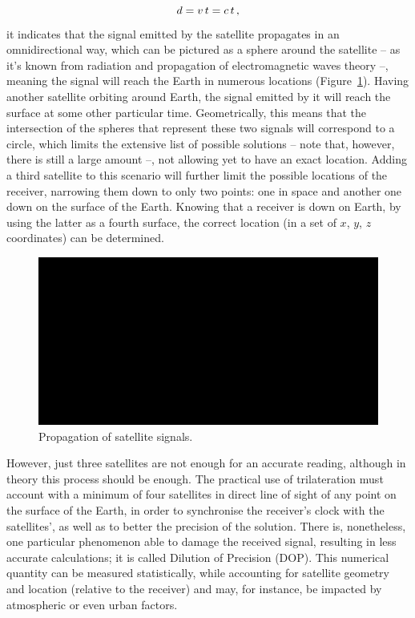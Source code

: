 \begin{equation}
    d = v\,t = c\,t\,,\medskip
\end{equation}
it indicates that the signal emitted by the satellite propagates in an omnidirectional way, which can be pictured as a sphere around the satellite -- as it's known from radiation and propagation of electromagnetic waves theory --, meaning the signal will reach the Earth in numerous locations (Figure~\ref{fig:omnidirectional}).
Having another satellite orbiting around Earth, the signal emitted by it will reach the surface at some other particular time. Geometrically, this means that the intersection of the spheres that represent these two signals will correspond to a circle, which limits the extensive list of possible solutions -- note that, however, there is still a large amount --, not allowing yet to have an exact location. Adding a third satellite to this scenario will further limit the possible locations of the receiver, narrowing them down to only two points: one in space and another one down on the surface of the Earth. Knowing that a receiver is down on Earth, by using the latter as a fourth surface, the correct location (in a set of $x$, $y$, $z$ coordinates) can be determined.
\begin{figure}[ht]
	\centering
	\includegraphics[width=1.0\textwidth]{Chapters/Figures/demo.png}
	\caption{Propagation of satellite signals.}
	\label{fig:omnidirectional}
\end{figure}
However, just three satellites are not enough for an accurate reading, although in theory this process should be enough. The practical use of trilateration must account with a minimum of four satellites in direct line of sight of any point on the surface of the Earth, in order to synchronise the receiver's clock with the satellites', as well as to better the precision of the solution.
There is, nonetheless, one particular phenomenon able to damage the received signal, resulting in less accurate calculations; it is called Dilution of Precision (DOP). This numerical quantity can be measured statistically, while accounting for satellite geometry and location (relative to the receiver) and may, for instance, be impacted by atmospheric or even urban factors.
